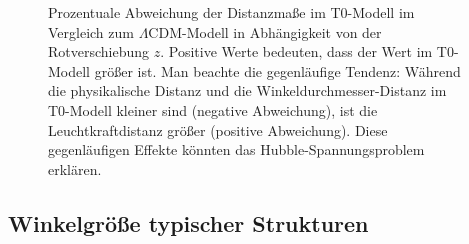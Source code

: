 \documentclass[a4paper,12pt]{article}
\theoremstyle{definition}
\theoremstyle{remark}
\begin{document}
	\begin{figure}[H]
		\centering
		\caption{Prozentuale Abweichung der Distanzmaße im T0-Modell im Vergleich zum $\Lambda$CDM-Modell in Abhängigkeit von der Rotverschiebung $z$. Positive Werte bedeuten, dass der Wert im T0-Modell größer ist. Man beachte die gegenläufige Tendenz: Während die physikalische Distanz und die Winkeldurchmesser-Distanz im T0-Modell kleiner sind (negative Abweichung), ist die Leuchtkraftdistanz größer (positive Abweichung). Diese gegenläufigen Effekte könnten das Hubble-Spannungsproblem erklären.}
		\label{fig:percentage_differences}
	\end{figure}
	
	\subsection{Winkelgröße typischer Strukturen}
	
\end{document}
